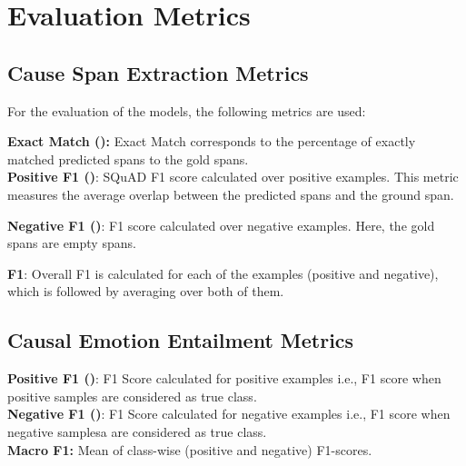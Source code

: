 \documentclass{article}
\begin{document}
\section{Evaluation Metrics}\label{app:metrics}
\subsection{Cause Span Extraction Metrics}
For the evaluation of the models, the following metrics are used:

\noindent\textbf{Exact Match ():} Exact Match corresponds to the percentage of exactly matched predicted spans to the gold spans.\\
\textbf{Positive F1 ()}: SQuAD F1 score \cite{rajpurkar2016squad} calculated over positive examples. This metric measures the average overlap between the predicted spans and the ground span. 

\textbf{Negative F1 ()}: F1 score calculated over negative examples. Here, the gold spans are empty spans.

\textbf{F1}: Overall F1 is calculated for each of the examples (positive and negative), which is followed by averaging over both of them.

\subsection{Causal Emotion Entailment Metrics}
\textbf{Positive F1 ()}: F1 Score calculated for positive examples i.e., F1 score when positive samples are considered as true class.\\
\textbf{Negative F1 ()}: F1 Score calculated for negative examples i.e., F1 score when negative samplesa are considered as true class.\\
\textbf{Macro F1:} Mean of class-wise (positive and negative) F1-scores.
\end{document}
